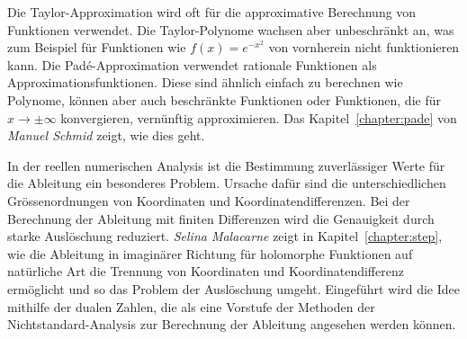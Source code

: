 %
%
Die Taylor-Approximation wird oft für die approximative Berechnung 
von Funktionen verwendet.
Die Taylor-Polynome wachsen aber unbeschränkt an, was zum Beispiel
für Funktionen wie $f(x)=e^{-x^2}$ von vornherein nicht funktionieren
kann.
Die Padé-Approximation verwendet rationale Funktionen als
Approximationsfunktionen.
Diese sind ähnlich einfach zu berechnen wie Polynome, können aber auch
beschränkte Funktionen oder Funktionen, die für $x\to\pm\infty$
konvergieren, vernünftig approximieren.
Das Kapitel~\ref{chapter:pade} von \emph{Manuel Schmid} zeigt, wie dies geht.
%
%

%
%
In der reellen numerischen Analysis ist die Bestimmung zuverlässiger
Werte für die Ableitung ein besonderes Problem.
Ursache dafür sind die unterschiedlichen Grössenordnungen von Koordinaten
und Koordinatendifferenzen.
%
%
Bei der Berechnung der Ableitung mit finiten Differenzen wird die
Genauigkeit durch starke Auslöschung reduziert.
%
\emph{Selina Malacarne} zeigt in Kapitel~\ref{chapter:step}, wie die
%
%
Ableitung in imaginärer Richtung für holomorphe Funktionen auf natürliche
Art die Trennung von Koordinaten und Koordinatendifferenz ermöglicht
und so das Problem der Auslöschung umgeht.
Eingeführt wird die Idee mithilfe der dualen Zahlen, die als eine
%
Vorstufe der Methoden der Nichtstandard-Analysis zur Berechnung der
%
Ableitung angesehen werden können.

